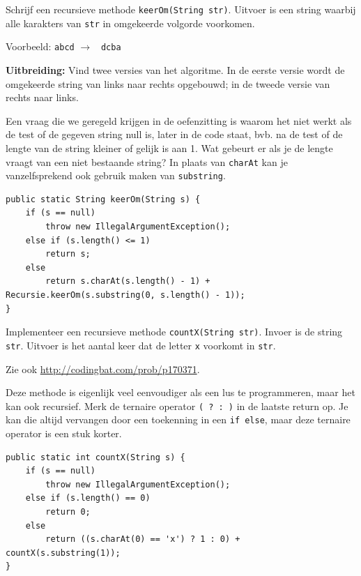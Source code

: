 \begin{oef}
\code Schrijf een recursieve methode \verb/keerOm(String str)/. Uitvoer is een string waarbij alle karakters van \verb/str/ in omgekeerde volgorde voorkomen.

Voorbeeld: \verb/abcd/ $\rightarrow$ \verb/ dcba/

{\textbf{Uitbreiding:}} Vind twee versies van het algoritme. In de eerste versie wordt de omgekeerde string van links naar rechts opgebouwd; in de tweede versie van rechts naar links.
\begin{opl}
Een vraag die we geregeld krijgen in de oefenzitting is waarom het niet werkt als de test of de gegeven string null is, later in de code staat, bvb. na de test of de lengte van de string kleiner of gelijk is aan 1. Wat gebeurt er als je de lengte vraagt van een niet bestaande string? In plaats van \verb+charAt+ kan je vanzelfsprekend ook gebruik maken van \verb+substring+. 
\begin{lstlisting}[caption={Recursieve methode om een string om te keren}, label=reckeerom]
public static String keerOm(String s) {
	if (s == null)
		throw new IllegalArgumentException();
	else if (s.length() <= 1)
		return s;
	else
		return s.charAt(s.length() - 1) + Recursie.keerOm(s.substring(0, s.length() - 1));
}
\end{lstlisting}
\end{opl}

\end{oef}

\begin{oef}
\code Implementeer een recursieve methode \verb/countX(String str)/. Invoer is de string \verb/str/. Uitvoer is het aantal keer dat de letter \verb/x/ voorkomt in \verb/str/.

Zie ook \url{http://codingbat.com/prob/p170371}.
\begin{opl}
Deze methode is eigenlijk veel eenvoudiger als een lus te programmeren, maar het kan ook recursief. Merk de ternaire operator \verb+( ? : )+ in de laatste return op. Je kan die altijd vervangen door een toekenning in een \verb+if else+, maar deze ternaire operator is een stuk korter.
\begin{lstlisting}[caption={Recursieve methode om het aantal keer te tellen dat de letter x in een string voorkomt}, label=reccountx]
public static int countX(String s) {
	if (s == null)
		throw new IllegalArgumentException();
	else if (s.length() == 0)
		return 0;
	else
		return ((s.charAt(0) == 'x') ? 1 : 0) + countX(s.substring(1));
}
\end{lstlisting}

\end{opl}

\end{oef}




